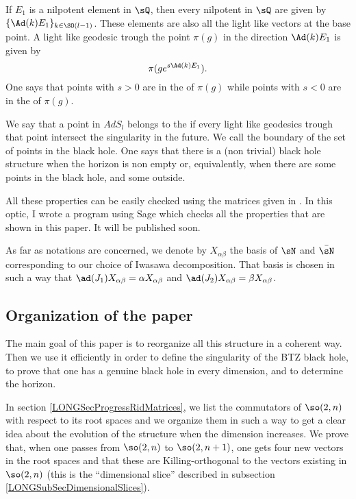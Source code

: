 If $E_1$ is a nilpotent element in $\sQ$, then every nilpotent in $\sQ$ are given by $\{ \Ad(k)E_1 \}_{k\in\SO(l-1)}$. These elements are also all the light like vectors at the base point. A light like geodesic trough the point $\pi(g)$ in the direction $\Ad(k)E_1$ is given by
\begin{equation}
	\pi(g e^{s\Ad(k)E_1}).
\end{equation}
One says that  points with $s>0$ are in the  of $\pi(g)$ while points with $s<0$ are in the  of $\pi(g)$. 

We say that a point in $AdS_l$ belongs to the  if every light like geodesics trough that point intersect the singularity in the future. We call  the boundary of the set of points in the black hole. One says that there is a (non trivial) black hole structure when the horizon is non empty or, equivalently, when there are some points in the black hole, and some outside.

All these properties can be easily checked using the matrices given in \cite{These,lcTNAdS}. In this optic, I wrote a program using Sage\cite{Sage} which checks all the properties that are shown in this paper. It will be published soon.

As far as notations are concerned, we denote by $X_{\alpha\beta}$ the basis of $\sN$ and $\bar\sN$ corresponding to our choice of Iwasawa decomposition. That basis is chosen in such a way that $\ad(J_1)X_{\alpha\beta}=\alpha X_{\alpha\beta}$ and $\ad(J_2)X_{\alpha\beta}=\beta X_{\alpha\beta}$.

%
\subsection{Organization of the paper}
%

The main goal of this paper is to reorganize all this structure in a coherent way. Then we use it efficiently in order to define the singularity of the BTZ black hole, to prove that one has a genuine black hole in every dimension, and to determine the horizon.

In section \ref{LONGSecProgressRidMatrices}, we list the commutators of $\so(2,n)$ with respect to its root spaces and we organize them in such a way to get a clear idea about the evolution of the structure when the dimension increases. We prove that, when one passes from $\so(2,n)$ to $\so(2,n+1)$, one gets four new vectors in the root spaces and that these are Killing-orthogonal to the vectors existing in $\so(2,n)$ (this is the ``dimensional slice'' described in subsection \ref{LONGSubSecDimensionalSlices}).

